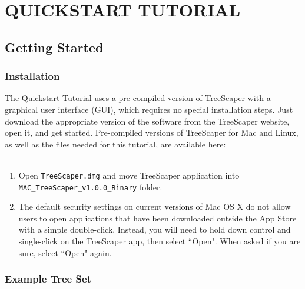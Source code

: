 \documentclass[11pt]{article}
\begin{document}
\newpage
\section{QUICKSTART TUTORIAL}\label{sect:QuickstartTutorial}

\subsection{Getting Started}\label{subsect:GettingStarted}

\subsubsection{Installation}\label{subsubsect:Installation}

The Quickstart Tutorial uses a pre-compiled version of TreeScaper with a graphical user interface (GUI), which requires no special installation steps. Just download the appropriate version of the software from the TreeScaper website, open it, and get started. Pre-compiled versions of TreeScaper for Mac and Linux, as well as the files needed for this tutorial, are available here: \\

 \\


\begin{enumerate}
\item Open {\tt TreeScaper.dmg} and move TreeScaper application into {\tt MAC\_TreeScaper\_v1.0.0\linebreak\_Binary} folder.


\item The default security settings on current versions of Mac OS X do not allow users to open applications that have been downloaded outside the App Store with a simple double-click. Instead, you will need to hold down control and single-click on the TreeScaper app, then select ``Open". When asked if you are sure, select ``Open" again.
\end{enumerate}


\subsubsection{Example Tree Set}\label{subsubsect:ExampleTreeSet}
\end{document}
